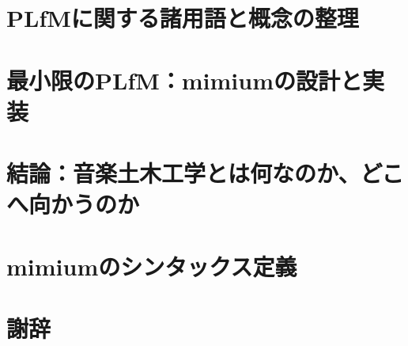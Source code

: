 \documentclass[luatex,unicode,titlepage,pdfusetitle,a4paper,openany]{ltjsbook}
\begin{document}
\chapter{PLfMに関する諸用語と概念の整理}\label{sec:chapter5}


\chapter{最小限のPLfM：mimiumの設計と実装}\label{sec:chapter6}


\chapter{結論：音楽土木工学とは何なのか、どこへ向かうのか}\label{sec:chapter7}



\appendix
\chapter{mimiumのシンタックス定義}\label{sec:appendA}


\backmatter

{}
\printbibliography[title = 参考文献]

{}
\chapter*{謝辞}

\end{document}
